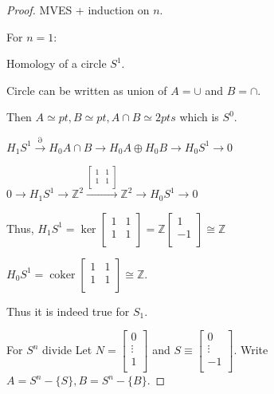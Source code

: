\documentclass{article}
\theoremstyle{definition}
\begin{document}
    \begin{proof}
        MVES + induction on \(n\).

        For \(n = 1\):

        Homology of a circle \(S^1\).

        Circle can be written as union of \(A = \cup\) and \( B = \cap\).
    
        Then \(A \simeq pt, B \simeq pt, A\cap B \simeq 2 pts\) which is \(S^0\).
    
        \(H_1 S^1 \xrightarrow{\partial} H_0 A \cap B \to H_0 A \oplus  H_0 B \to H_0 S^1 \to 0\) 
    
        \(0 \to H_1 S^1 \to \mathbb{Z}^2 \xrightarrow{\begin{bmatrix}
            1 & 1 \\
            1 & 1 \\
        \end{bmatrix}} \mathbb{Z}^2 \to H_0 S^1 \to 0\)
        
        Thus, \(H_1 S^1 = \ker \begin{bmatrix}
            1 & 1 \\
            1 & 1 \\
        \end{bmatrix} = \mathbb{Z} \begin{bmatrix}
            1 \\
            -1 \\
        \end{bmatrix} \cong \mathbb{Z}\) 
    
        \(H_0 S^1 = \operatorname{coker} \begin{bmatrix}
            1 & 1 \\
            1 & 1 \\
        \end{bmatrix} \cong \mathbb{Z}\).

        Thus it is indeed true for \(S_1\).

        For \(S^n\) divide Let \(N = \begin{bmatrix}
            0 \\
            \vdots \\
            1 \\
        \end{bmatrix}\) and \(S \equiv  \begin{bmatrix}
            0 \\
            \vdots \\
            -1 \\
        \end{bmatrix}\). Write \(A = S^n - \{ S \}, B = S^n - \{ B \} \).
        

\end{proof}
\end{document}
